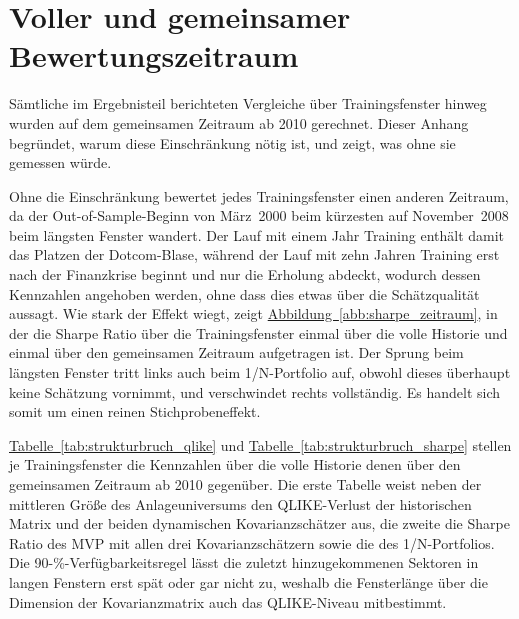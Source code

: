 
\addappheadtotoc

\MSonehalfspacing
\appendices
\appendixpage
\appendixtitleoff

\section{Voller und gemeinsamer Bewertungszeitraum}\label{sec:anhang_strukturbruch}
Sämtliche im Ergebnisteil berichteten Vergleiche über Trainingsfenster hinweg wurden auf dem gemeinsamen Zeitraum ab 2010 gerechnet.
Dieser Anhang begründet, warum diese Einschränkung nötig ist, und zeigt, was ohne sie gemessen würde.

Ohne die Einschränkung bewertet jedes Trainingsfenster einen anderen Zeitraum, da der Out-of-Sample-Beginn von März~2000 beim kürzesten auf November~2008 beim längsten Fenster wandert.
Der Lauf mit einem Jahr Training enthält damit das Platzen der Dotcom-Blase, während der Lauf mit zehn Jahren Training erst nach der Finanzkrise beginnt und nur die Erholung abdeckt, wodurch dessen Kennzahlen angehoben werden, ohne dass dies etwas über die Schätzqualität aussagt.
Wie stark der Effekt wiegt, zeigt \hyperref[abb:sharpe_zeitraum]{Abbildung~\ref*{abb:sharpe_zeitraum}}, in der die Sharpe Ratio über die Trainingsfenster einmal über die volle Historie und einmal über den gemeinsamen Zeitraum aufgetragen ist.
Der Sprung beim längsten Fenster tritt links auch beim 1/N-Portfolio auf, obwohl dieses überhaupt keine Schätzung vornimmt, und verschwindet rechts vollständig.
Es handelt sich somit um einen reinen Stichprobeneffekt.



\hyperref[tab:strukturbruch_qlike]{Tabelle~\ref*{tab:strukturbruch_qlike}} und \hyperref[tab:strukturbruch_sharpe]{Tabelle~\ref*{tab:strukturbruch_sharpe}} stellen je Trainingsfenster die Kennzahlen über die volle Historie denen über den gemeinsamen Zeitraum ab 2010 gegenüber.
Die erste Tabelle weist neben der mittleren Größe des Anlageuniversums den QLIKE-Verlust der historischen Matrix und der beiden dynamischen Kovarianzschätzer aus, die zweite die Sharpe Ratio des MVP mit allen drei Kovarianzschätzern sowie die des 1/N-Portfolios.
Die 90-\%-Verfügbarkeitsregel lässt die zuletzt hinzugekommenen Sektoren in langen Fenstern erst spät oder gar nicht zu, weshalb die Fensterlänge über die Dimension der Kovarianzmatrix auch das QLIKE-Niveau mitbestimmt.

